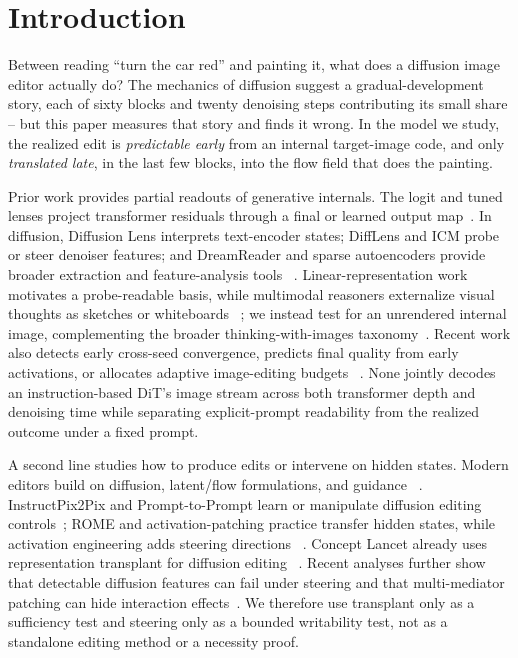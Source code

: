 \section{Introduction}\label{sec:intro}

Between reading ``turn the car red'' and painting it, what does a
diffusion image editor actually do? The mechanics of diffusion suggest
a gradual-development story, each of sixty blocks and twenty denoising
steps contributing its small share -- but this paper measures that
story and finds it wrong. In the model we study, the realized edit is
\emph{predictable early} from an internal target-image code, and only
\emph{translated late}, in the last few blocks, into the flow field that does
the painting.

Prior work provides partial readouts of generative internals. The logit and
tuned lenses project transformer residuals through a final or learned output
map~\citep{nostalgebraist2020logitlens,belrose2023tuned}. In diffusion,
Diffusion Lens interprets text-encoder states; DiffLens and ICM probe or steer
denoiser features; and DreamReader and sparse autoencoders provide broader
extraction and feature-analysis tools
~\citep{toker2024diffusionlens,shi2025difflens,zaleska2026icm,prakash2026dreamreader,surkov2025sae}.
Linear-representation work motivates a probe-readable basis, while multimodal
reasoners externalize visual thoughts as sketches or whiteboards
~\citep{park2024linear,hu2024sketchpad,menon2024whiteboard,wu2024vot,li2025mvot};
we instead test for an unrendered internal image, complementing the broader
thinking-with-images taxonomy~\citep{su2025thinkingsurvey}.
Recent work also detects early cross-seed convergence, predicts final quality
from early activations, or allocates adaptive image-editing budgets
~\citep{kwon2026lockin,guo2026probeselect,qu2026adecot}. None jointly decodes
an instruction-based DiT's image stream across both transformer depth and
denoising time while separating explicit-prompt readability from the realized
outcome under a fixed prompt.

A second line studies how to produce edits or intervene on hidden states.
Modern editors build on diffusion, latent/flow formulations, and guidance
~\citep{ho2020ddpm,song2021ddim,rombach2022ldm,lipman2023flowmatching,liu2023rectifiedflow,ho2022cfg}.
InstructPix2Pix and Prompt-to-Prompt learn or manipulate diffusion editing
controls~\citep{brooks2023instructpix2pix,hertz2023prompttoprompt}; ROME and
activation-patching practice transfer hidden states, while activation
engineering adds steering directions
~\citep{meng2022rome,heimersheim2024activation,turner2023actadd}. Concept
Lancet already uses representation transplant for diffusion editing
~\citep{luo2025colan}. Recent analyses further show that detectable diffusion
features can fail under steering and that multi-mediator patching can hide
interaction effects~\citep{cassano2026look,vaidyanathan2026curse}. We therefore
use transplant only as a sufficiency test and steering only as a bounded
writability test, not as a standalone editing method or a necessity proof.

